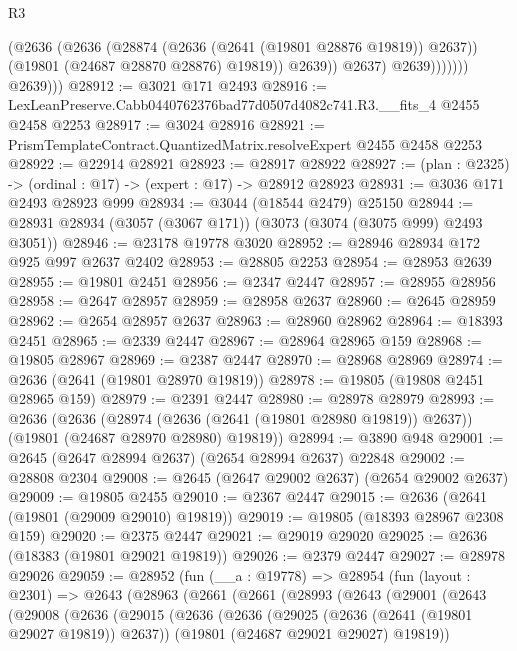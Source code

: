 \begin{lexlean}{R3}
\begin{coremodule}
                            (@2636
                              (@2636
                                (@28874 (@2636 (@2641 (@19801 @28876 @19819)) @2637))
                                (@19801 (@24687 @28870 @28876) @19819))
                              @2639))
                          @2637)
                        @2639)))))))
          @2639)))
@28912 := @3021 @171 @2493
@28916 := LexLeanPreserve.Cabb0440762376bad77d0507d4082c741.R3.__fits_4 @2455 @2458 @2253
@28917 := @3024 @28916
@28921 := PrismTemplateContract.QuantizedMatrix.resolveExpert @2455 @2458 @2253
@28922 := @22914 @28921
@28923 := @28917 @28922
@28927 := (plan : @2325) -> (ordinal : @17) -> (expert : @17) -> @28912 @28923
@28931 := @3036 @171 @2493 @28923 @999
@28934 := @3044 (@18544 @2479) @25150
@28944 := @28931 @28934 (@3057 (@3067 @171)) (@3073 (@3074 (@3075 @999) @2493 @3051))
@28946 := @23178 @19778 @3020
@28952 := @28946 @28934 @172 @925 @997 @2637 @2402
@28953 := @28805 @2253
@28954 := @28953 @2639
@28955 := @19801 @2451
@28956 := @2347 @2447
@28957 := @28955 @28956
@28958 := @2647 @28957
@28959 := @28958 @2637
@28960 := @2645 @28959
@28962 := @2654 @28957 @2637
@28963 := @28960 @28962
@28964 := @18393 @2451
@28965 := @2339 @2447
@28967 := @28964 @28965 @159
@28968 := @19805 @28967
@28969 := @2387 @2447
@28970 := @28968 @28969
@28974 := @2636 (@2641 (@19801 @28970 @19819))
@28978 := @19805 (@19808 @2451 @28965 @159)
@28979 := @2391 @2447
@28980 := @28978 @28979
@28993 := @2636
    (@2636
      (@28974 (@2636 (@2641 (@19801 @28980 @19819)) @2637))
      (@19801 (@24687 @28970 @28980) @19819))
@28994 := @3890 @948
@29001 := @2645 (@2647 @28994 @2637) (@2654 @28994 @2637) @22848
@29002 := @28808 @2304
@29008 := @2645 (@2647 @29002 @2637) (@2654 @29002 @2637)
@29009 := @19805 @2455
@29010 := @2367 @2447
@29015 := @2636 (@2641 (@19801 (@29009 @29010) @19819))
@29019 := @19805 (@18393 @28967 @2308 @159)
@29020 := @2375 @2447
@29021 := @29019 @29020
@29025 := @2636 (@18383 (@19801 @29021 @19819))
@29026 := @2379 @2447
@29027 := @28978 @29026
@29059 := @28952
    (fun (__a : @19778) =>
    @28954
      (fun (layout : @2301) =>
      @2643
        (@28963
          (@2661
            (@2661
              (@28993
                (@2643
                  (@29001
                    (@2643
                      (@29008
                        (@2636
                          (@29015
                            (@2636
                              (@2636
                                (@29025 (@2636 (@2641 (@19801 @29027 @19819)) @2637))
                                (@19801 (@24687 @29021 @29027) @19819))

\end{coremodule}
\end{lexlean}
